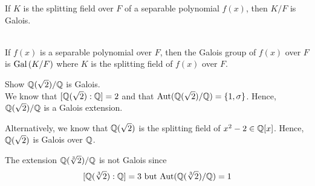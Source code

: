 \begin{corollary}
    If $K$ is the splitting field over $F$ of a separable polynomial $f(x)$, then $K/F$ is Galois.
\end{corollary}

\begin{definition} \leavevmode \\
    If $f(x)$ is a separable polynomial over $F$, then the Galois group of $f(x)$ over $F$ is $\text{Gal}\left(K/F\right)$ where $K$ is the splitting field of $f(x)$ over $F$.
\end{definition}

\begin{example}
    Show $\mathbb{Q}(\sqrt{2})/\mathbb{Q}$ is Galois. \\
    We know that $[\mathbb{Q}(\sqrt{2}):\mathbb{Q}] = 2$ and that $\text{Aut}(\mathbb{Q}(\sqrt{2})/\mathbb{Q}) = \left\{1, \sigma\right\}$. Hence, $\mathbb{Q}(\sqrt{2})/\mathbb{Q}$ is a Galois extension.

    Alternatively, we know that $\mathbb{Q}(\sqrt{2})$ is the splitting field of $x^2-2 \in \mathbb{Q}[x]$. Hence, $\mathbb{Q}(\sqrt{2})$ is Galois over $\mathbb{Q}$.
\end{example}

\begin{example}
    The extension $\mathbb{Q}(\sqrt[3]{2})/\mathbb{Q}$ is not Galois since
    $$[\mathbb{Q}(\sqrt[3]{2}):\mathbb{Q}] = 3 \text{ but } \text{Aut}(\mathbb{Q}(\sqrt[3]{2})/\mathbb{Q}) = 1$$
\end{example}


